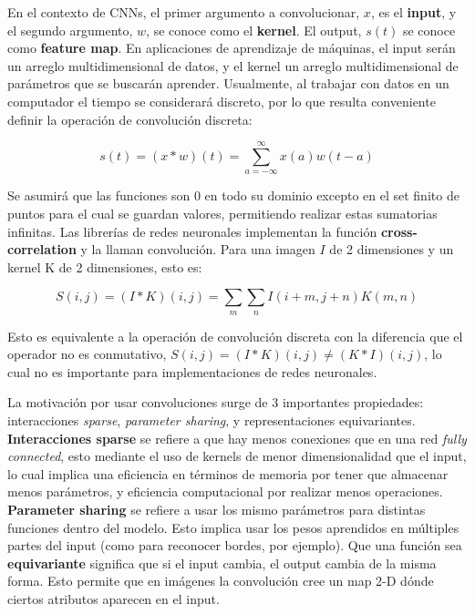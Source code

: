 En el contexto de CNNs, el primer argumento a convolucionar, $x$, es el \textbf{input}, y el segundo argumento, $w$, se conoce como el \textbf{kernel}. El output, $s(t)$ se conoce como \textbf{feature map}. En aplicaciones de aprendizaje de m\'aquinas, el input ser\'an un arreglo multidimensional de datos, y el kernel un arreglo multidimensional de par\'ametros que se buscar\'an aprender. Usualmente, al trabajar con datos en un computador el tiempo se considerar\'a discreto, por lo que resulta conveniente definir la operaci\'on de convoluci\'on discreta:

\begin{equation}
s(t) = (x * w)(t) = \sum_{a=-\infty}^{\infty} x(a)w(t-a)
\end{equation}

Se asumir\'a que las funciones son 0 en todo su dominio excepto en el set finito de puntos para el cual se guardan valores, permitiendo realizar estas sumatorias infinitas. Las librer\'ias de redes neuronales implementan la funci\'on \textbf{cross-correlation} y la llaman convoluci\'on. Para una imagen $I$ de 2 dimensiones y un kernel K de 2 dimensiones, esto es: 

\begin{equation}
S(i,j) = (I * K)(i,j) = \sum_{m}\sum_{n} I(i+m,j+n)K(m,n)
\end{equation}

Esto es equivalente a la operaci\'on de convoluci\'on discreta con la diferencia que el operador no es conmutativo, $S(i,j) = (I * K)(i,j) \neq (K * I)(i,j)$, lo cual no es importante para implementaciones de redes neuronales. 


La motivaci\'on por usar convoluciones surge de 3 importantes propiedades: interacciones \textit{sparse}, \textit{parameter sharing}, y representaciones equivariantes. \textbf{Interacciones sparse} se refiere a que hay menos conexiones que en una red \textit{fully connected}, esto mediante el uso de kernels de menor dimensionalidad que el input, lo cual implica una eficiencia en t\'erminos de memoria por tener que almacenar menos par\'ametros, y eficiencia computacional por realizar menos operaciones. \textbf{Parameter sharing} se refiere a usar los mismo par\'ametros para distintas funciones dentro del modelo. Esto implica usar los pesos aprendidos en m\'ultiples partes del input (como para reconocer bordes, por ejemplo). Que una funci\'on sea \textbf{equivariante} significa que si el input cambia, el output cambia de la misma forma. Esto permite que en im\'agenes la convoluci\'on cree un map 2-D d\'onde ciertos atributos aparecen en el input.

